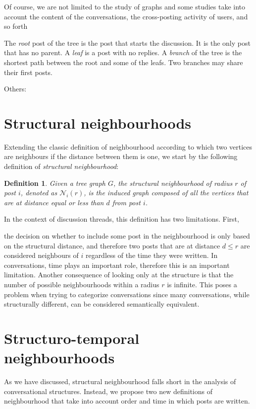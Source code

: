 \documentclass[conference]{IEEEtran}
\newtheorem{definition}{Definition}
\begin{document}
Of course, we are not limited to the study of graphs and some studies take into account the content of the conversations, the cross-posting activity of users, and so forth \cite{Whittaker1998}

The \textit{root} post of the tree is the post that starts the discussion. It is the only post that has no parent. A \textit{leaf} is a post with no replies.
A \textit{branch} of the tree is the shortest path between the root and some of the leafs. Two branches may share their first posts.


Others: \cite{Gaumont2016}

\section{Structural neighbourhoods}
Extending the classic definition of neighbourhood according to which two vertices are neighbours if the distance between them is one, we start by the following definition of \textit{structural neighbourhood}:

\begin{definition}
Given a tree graph $G$, the \textit{structural neighbourhood} of radius $r$ of post $i$, denoted as $\mathcal{N}_i(r)$, is the induced graph composed of all the vertices that are at distance equal or less than $d$ from post $i$.
\end{definition}
In the context of discussion threads, this definition has two limitations. First,

 the decision on whether to include some post in the neighbourhood is only based on the structural distance, and therefore two posts that are at distance $d\leq r$ are considered neighbours of $i$ regardless of the time they were written. In conversations, time plays an important role, therefore this is an important limitation. Another consequence of looking only at the structure is that the number of possible neighbourhoods within a radius $r$ is infinite. This poses a problem when trying to categorize conversations since many conversations, while structurally different, can be considered semantically equivalent.

\section{Structuro-temporal neighbourhoods}
As we have discussed, structural neighbourhood falls short in the analysis of conversational structures. Instead, we propose two new definitions of neighbourhood that take into account order and time in which posts are written. 
\end{document}
